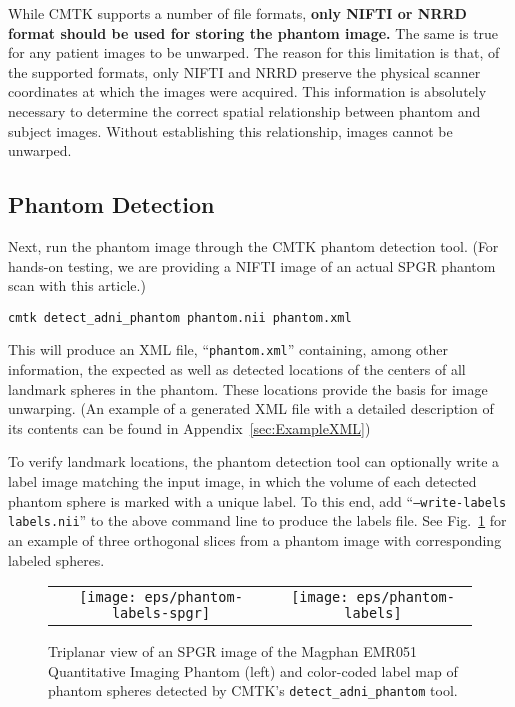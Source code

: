 \documentclass{InsightArticle}
\begin{document}
While CMTK supports a number of file formats, {\bf only NIFTI or NRRD format
  should be used for storing the phantom image.} The same is true for any
patient images to be unwarped. The reason for this limitation is that, of the
supported formats, only NIFTI and NRRD preserve the physical scanner
coordinates at which the images were acquired. This information is absolutely
necessary to determine the correct spatial relationship between phantom and
subject images. Without establishing this relationship, images cannot be unwarped.

\subsection{Phantom Detection}

Next, run the phantom image through the CMTK phantom detection tool. (For
hands-on testing, we are providing a NIFTI image of an actual SPGR phantom
scan with this article.)
\begin{verbatim}
cmtk detect_adni_phantom phantom.nii phantom.xml
\end{verbatim}
This will produce an XML file, ``\texttt{phantom.xml}'' containing, among
other information, the expected as well as detected locations of the centers
of all landmark spheres in the phantom. These locations provide the basis for
image unwarping. (An example of a generated XML file with a detailed
description of its contents can be found in Appendix~\ref{sec:ExampleXML})

To verify landmark locations, the phantom detection tool can optionally write
a label image matching the input image, in which the volume of each detected
phantom sphere is marked with a unique label. To this end, add
``\texttt{--write-labels labels.nii}'' to the above command line to produce
the labels file. See Fig.~\ref{fig:PhantomLabels} for an example of three
orthogonal slices from a phantom image with corresponding labeled spheres.

\begin{figure}[tbp]
\begin{center}
\setlength\tabcolsep{0.5mm}
\begin{tabular}{cc}
\texttt{[image: eps/phantom-labels-spgr]} &
\texttt{[image: eps/phantom-labels]}
\end{tabular}
\end{center}
\caption{Triplanar view of an SPGR image of the
Magphan\textsuperscript{\textregistered} EMR051 Quantitative Imaging Phantom
(left) and color-coded label map of phantom spheres detected by CMTK's
\texttt{detect\_adni\_phantom} tool.}
\label{fig:PhantomLabels}
\end{figure}
\end{document}
